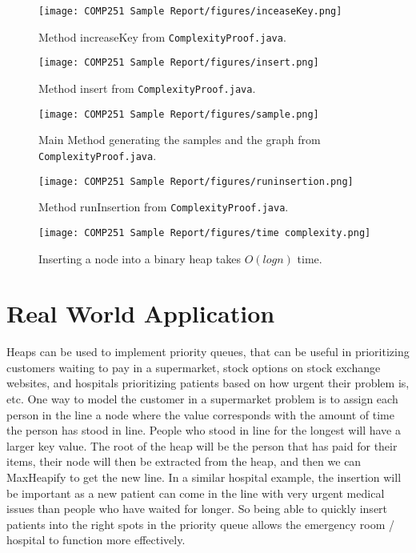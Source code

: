 \documentclass[12pt]{article}
\begin{document}
\begin{figure}[h]
  \centering
    \texttt{[image: COMP251 Sample Report/figures/inceaseKey.png]}
        \caption{Method increaseKey from \texttt{ComplexityProof.java}.}
\end{figure}

\begin{figure}[h]
  \centering
    \texttt{[image: COMP251 Sample Report/figures/insert.png]}
        \caption{Method insert from \texttt{ComplexityProof.java}.}
\end{figure}

\begin{figure}[h]
  \centering
    \texttt{[image: COMP251 Sample Report/figures/sample.png]}
        \caption{Main Method generating the samples and the graph from \texttt{ComplexityProof.java}.}
\end{figure}

\begin{figure}[h]
  \centering
    \texttt{[image: COMP251 Sample Report/figures/runinsertion.png]}
        \caption{Method runInsertion from \texttt{ComplexityProof.java}.}
\end{figure}

\begin{figure}[h]
  \centering
    \texttt{[image: COMP251 Sample Report/figures/time complexity.png]}
        \caption{ Inserting a node into a binary heap takes $O(logn)$ time. }
\end{figure}

\clearpage
\section*{Real World Application} 
Heaps can be used to implement priority queues, that can be useful in prioritizing customers waiting to pay in a supermarket, stock options on stock exchange websites, and hospitals prioritizing patients based on how urgent their problem is, etc. One way to model the customer in a supermarket problem is to assign each person in the line a node where the value corresponds with the amount of time the person has stood in line. People who stood in line for the longest will have a larger key value. The root of the heap will be the person that has paid for their items, their node will then be extracted from the heap, and then we can MaxHeapify to get the new line\cite{bri}. In a similar hospital example, the insertion will be important as a new patient can come in the line with very urgent medical issues than people who have waited for longer. So being able to quickly insert patients into the right spots in the priority queue allows the emergency room / hospital to function more effectively\cite{geeks}.
\end{document}
